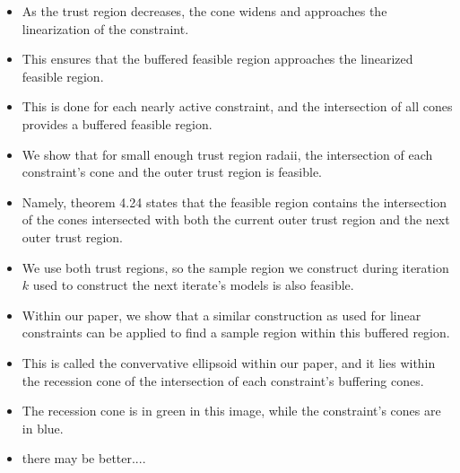 \documentclass{article}
\begin{document}
\hrulefill

\begin{itemize}
\item As the trust region decreases, the cone widens and approaches the linearization of the constraint.
\item This ensures that the buffered feasible region approaches the linearized feasible region.
\end{itemize}

\hrulefill

\begin{itemize}
\item This is done for each nearly active constraint, and the intersection of all cones provides a buffered feasible region.
\item We show that for small enough trust region radaii, the intersection of each constraint's cone and the outer trust region is feasible.
\end{itemize}

\hrulefill

\begin{itemize}
\item Namely, theorem 4.24 states that the feasible region contains the intersection of the cones intersected with both the current outer trust region and the next outer trust region.
\item We use both trust regions, so the sample region we construct during iteration $k$ used to construct the next iterate's models is also feasible.
\end{itemize}

\hrulefill
% 
% 

\begin{itemize}
\item Within our paper, we show that a similar construction as used for linear constraints can be applied to find a sample region within this buffered region.
\item This is called the convervative ellipsoid within our paper, and it lies within the recession cone of the intersection of each constraint's buffering cones.
\item The recession cone is in green in this image, while the constraint's cones are in blue.
\item there may be better....
\end{itemize}
\end{document}

